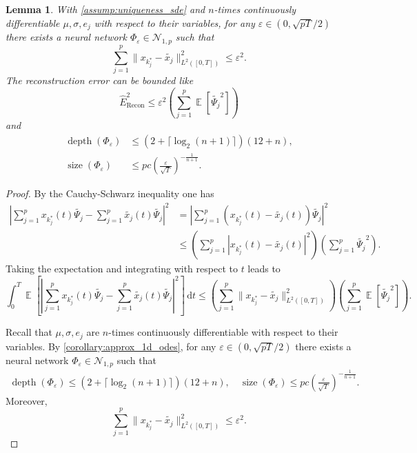\documentclass[12pt]{article}
\newtheorem{lemma}[theorem]{Lemma}
\theoremstyle{remark}
\theoremstyle{plain}
\numberwithin{equation}{section}
\newcommand{\dd}{\ensuremath{\,\mathrm d}}
\DeclareMathOperator{\E}{\mathbb E}
\DeclareMathOperator{\Size}{size}
\DeclareMathOperator{\Depth}{depth}
\begin{document}
\begin{lemma}\label{lemma:nn_reconstruction}
    With \cref{assump:uniqueness_sde} and $n$-times continuously differentiable $\mu,\sigma,e_j$ with respect to their variables, for any $\varepsilon \in (0, \sqrt{pT}/2)$ there exists a neural network $\Phi_\varepsilon \in \mathcal N_{1,p}$ such that
    \begin{equation*}
        \sum_{j=1}^p \|x_{k_j^*}-\widetilde{x_j}\|_{L^2([0,T])}^2 \leq \varepsilon^2.
    \end{equation*}
    The \emph{reconstruction error} can be bounded like
    \begin{equation*}
        \hat E_\text{Recon}^2 \leq \varepsilon^2 \left(\sum_{j=1}^p \E[\widetilde{\Psi_j}^2]\right)
    \end{equation*}
    and
    \begin{align*}
        \Depth(\Phi_\varepsilon) &\leq (2+\lceil \log_2(n+1)\rceil)(12+n),\\
        \Size(\Phi_\varepsilon) &\leq pc\left(\frac{\varepsilon}{\sqrt T}\right)^{-\frac{1}{n+1}}.
    \end{align*}
\end{lemma}
\begin{proof}
    By the Cauchy-Schwarz inequality one has
    \begin{align*}
        \left|\sum_{j=1}^p x_{k_j^*}(t)\widetilde{\Psi_j} - \sum_{j=1}^p \widetilde{x_j}(t) \widetilde{\Psi_j} \right|^2 &= \left|\sum_{j=1}^p (x_{k_j^*}(t) - \widetilde{x_j}(t))\widetilde{\Psi_j} \right|^2\\
        &\leq \left(\sum_{j=1}^p |x_{k_j^*}(t) - \widetilde{x_j}(t)|^2 \right) \left(\sum_{j=1}^p \widetilde{\Psi_j}^2\right).
    \end{align*}
    Taking the expectation and integrating with respect to $t$ leads to
    \begin{equation*}
        \int_0^T \E\left[\left|\sum_{j=1}^p x_{k_j^*}(t)\widetilde{\Psi_j} - \sum_{j=1}^p \widetilde{x_j}(t) \widetilde{\Psi_j} \right|^2 \right]\dd t \leq \left(\sum_{j=1}^p \|x_{k_j^*}-\widetilde{x_j}\|_{L^2([0,T])}^2\right)\left(\sum_{j=1}^p \E[\widetilde{\Psi_j}^2]\right).
    \end{equation*}

    Recall that $\mu,\sigma,e_j$ are $n$-times continuously differentiable with respect to their variables.
    By \cref{corollary:approx_1d_odes}, for any $\varepsilon \in (0, \sqrt{pT}/2)$ there exists a neural network $\Phi_\varepsilon \in \mathcal N_{1,p}$ such that
    \begin{align*}
        \Depth(\Phi_\varepsilon) \leq (2+\lceil \log_2(n+1)\rceil)(12+n),\quad
        \Size(\Phi_\varepsilon) \leq pc\left(\frac{\varepsilon}{\sqrt T}\right)^{-\frac{1}{n+1}}.
    \end{align*}
    Moreover,
    \begin{equation*}
        \sum_{j=1}^p \|x_{k_j^*}-\widetilde{x_j}\|_{L^2([0,T])}^2 \leq \varepsilon^2. %
    \end{equation*}
\end{proof}
\end{document}
